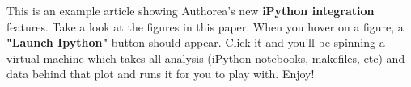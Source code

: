 This is an example article showing Authorea's new \textbf{iPython integration} features. Take a look at the figures in this paper. When you hover on a figure, a \textbf{"Launch Ipython"} button should appear. Click it and you'll be spinning a virtual machine which takes all analysis (iPython notebooks, makefiles, etc) and data behind that plot and runs it for you to play with. Enjoy! 